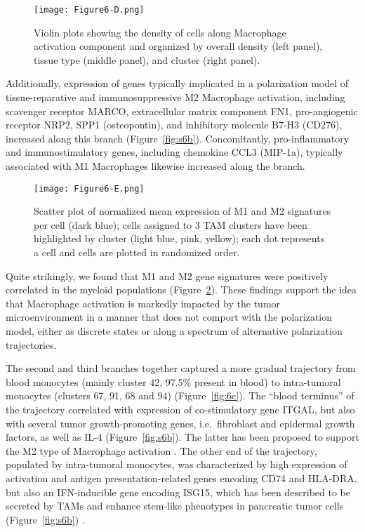 \begin{figure}
\centering
\texttt{[image: Figure6-D.png]}
\caption{Violin plots showing the density of cells along Macrophage activation component and organized by overall density (left panel), tissue type (middle panel), and cluster (right panel).
}
\label{fig:6d}
\end{figure}

Additionally, expression of genes typically implicated in a polarization model of tissue-reparative and immunosuppressive M2 Macrophage activation, including scavenger receptor MARCO, extracellular matrix component FN1, pro-angiogenic receptor NRP2, SPP1 (osteopontin), and inhibitory molecule B7-H3 (CD276), increased along this branch (Figure~\ref{fig:s6b}).
Concomitantly, pro-inflammatory and immunostimulatory genes, including chemokine CCL3 (MIP-1a), typically associated with M1 Macrophages likewise increased along the branch.

\begin{figure}
\centering
\texttt{[image: Figure6-E.png]}
\caption{Scatter plot of normalized mean expression of M1 and M2 signatures per cell (dark blue); cells assigned to 3 TAM clusters have been highlighted by cluster (light blue, pink, yellow); each dot represents a cell and cells are plotted in randomized order.
}
\label{fig:6e}
\end{figure}

Quite strikingly, we found that M1 and M2 gene signatures were positively correlated in the myeloid populations (Figure~\ref{fig:6e}).
These findings support the idea that Macrophage activation is markedly impacted by the tumor microenvironment in a manner that does not comport with the polarization model, either as discrete states or along a spectrum of alternative polarization trajectories.

The second and third branches together captured a more gradual trajectory from blood monocytes (mainly cluster 42, 97.5\% present in blood) to intra-tumoral monocytes (clusters 67, 91, 68 and 94) (Figure~\ref{fig:6c}).
The ``blood terminus'' of the trajectory correlated with expression of co-stimulatory gene ITGAL, but also with several tumor growth-promoting genes, i.e.\ fibroblast and epidermal growth factors, as well as IL-4 (Figure~\ref{fig:s6b}).
The latter has been proposed to support the M2 type of Macrophage activation \citep{Mantovani2013,Mills2000,Murray2014}.
The other end of the trajectory, populated by intra-tumoral monocytes, was characterized by high expression of activation and antigen presentation-related genes encoding CD74 and HLA-DRA, but also an IFN-inducible gene encoding ISG15, which has been described to be secreted by TAMs and enhance stem-like phenotypes in pancreatic tumor cells (Figure~\ref{fig:s6b}) \citep{Sainz2014}.

